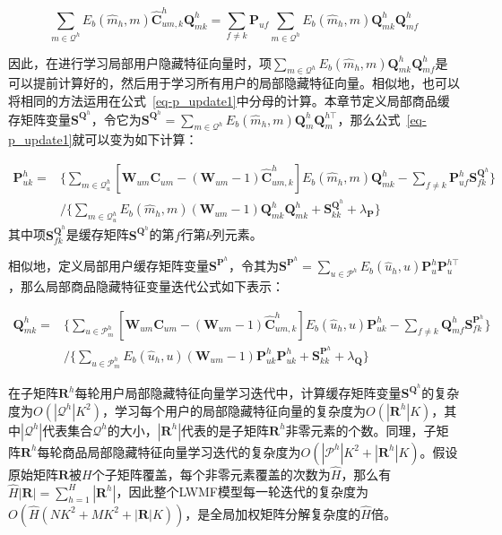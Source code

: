 \begin{equation}
\sum_{m\in \mathcal{Q}^h}\mathit{E_{b}}(\hat{m}_h, m)\mathbf{\hat{C}}_{um,k}^h\mathbf{Q}_{mk}^h 
= \sum_{f\neq k}\mathbf{P}_{uf}\sum_{m\in \mathcal{Q}^h}\mathit{E_{b}}(\hat{m}_h, m)\mathbf{Q}_{mk}^h\mathbf{Q}_{mf}^h
\end{equation}

因此，在进行学习局部用户隐藏特征向量时，项$\sum_{m\in \mathcal{Q}^h}\mathit{E_{b}}(\hat{m}_h, m)\mathbf{Q}_{mk}^h\mathbf{Q}_{mf}^h$是可以提前计算好的，然后用于学习所有用户的局部隐藏特征向量。相似地，也可以将相同的方法运用在公式~\ref{eq-p_update1}中分母的计算。本章节定义局部商品缓存矩阵变量$\mathbf{S}^{\mathbf{Q}^h}$，令它为$\mathbf{S}^{\mathbf{Q}^h}=\sum_{m\in \mathcal{Q}^h}\mathit{E_{b}}(\hat{m}_h, m)\mathbf{Q}_m^h\mathbf{Q}_m^{h\top}$，那么公式~\ref{eq-p_update1}就可以变为如下计算：

\begin{align}
\label{eq-p_update2}
\mathbf{P}_{uk}^h =& \{\sum_{m\in \mathcal{Q}_u^h}[\mathbf{W}_{um}\mathbf{C}_{um}-(\mathbf{W}_{um}-1)\mathbf{\hat{C}}_{um,k}^h]\mathit{E_{b}}(\hat{m}_h, m)\mathbf{Q}_{mk}^h
-\sum_{f\neq k}\mathbf{P}_{uf}^h\mathbf{S}^{\mathbf{Q}^h}_{fk}\}\nonumber\\&/\{\sum_{m\in \mathcal{Q}^h_u}\mathit{E_{b}}(\hat{m}_h, m)(\mathbf{W}_{um}-1)\mathbf{Q}_{mk}^h\mathbf{Q}_{mk}^h+\mathbf{S}^{\mathbf{Q}^h}_{kk}+\lambda_\mathbf{P}\}
\end{align}
其中项$\mathbf{S}^{\mathbf{Q}^h}_{fk}$是缓存矩阵$\mathbf{S}^{\mathbf{Q}^h}$的第$f$行第$k$列元素。

相似地，定义局部用户缓存矩阵变量$\mathbf{S}^{\mathbf{P}^h}$，令其为$\mathbf{S}^{\mathbf{P}^h}=\sum_{u\in \mathcal{P}^h}\mathit{E_{b}}(\hat{u}_h, u)\mathbf{P}_u^h\mathbf{P}_u^{h\top}$，那么局部商品隐藏特征变量迭代公式如下表示：

\begin{align}
\label{eq-q_update2}
\mathbf{Q}_{mk}^h = &\{\sum_{u\in \mathcal{P}_m^h}[\mathbf{W}_{um}\mathbf{C}_{um}-(\mathbf{W}_{um}-1)\mathbf{\hat{C}}_{um,k}^h]\mathit{E_{b}}(\hat{u}_h, u)\mathbf{P}_{uk}^h
-\sum_{f\neq k}\mathbf{Q}_{mf}^h\mathbf{S}^{\mathbf{P}^h}_{fk}\}\nonumber\\&/\{\sum_{u\in \mathcal{P}^h_m}\mathit{E_{b}}(\hat{u}_h, u)(\mathbf{W}_{um}-1)\mathbf{P}_{uk}^h\mathbf{P}_{uk}^h+\mathbf{S}^{\mathbf{P}^h}_{kk}+\lambda_\mathbf{Q}\}
\end{align}

在子矩阵$\mathbf{R}^h$每轮用户局部隐藏特征向量学习迭代中，计算缓存矩阵变量$\mathbf{S}^{\mathbf{Q}^h}$的复杂度为$O(|\mathcal{Q}^h|K^2)$，学习每个用户的局部隐藏特征向量的复杂度为$O(|\mathbf{R}^h|K)$，其中$|\mathcal{Q}^h|$代表集合$\mathcal{Q}^h$的大小，$|\mathbf{R}^h|$代表的是子矩阵$\mathbf{R}^h$非零元素的个数。同理，子矩阵$\mathbf{R}^h$每轮商品局部隐藏特征向量学习迭代的复杂度为$O(|\mathcal{P}^h|K^2+|\mathbf{R}^h|K)$。假设原始矩阵$\mathbf{R}$被$H$个子矩阵覆盖，每个非零元素覆盖的次数为$\hat{H}$，那么有$\hat{H}|\mathbf{R}|=\sum_{h=1}^{H}|\mathbf{R}^h|$，因此整个LWMF模型每一轮迭代的复杂度为$O(\hat{H}(NK^2+MK^2+|\mathbf{R}|K))$，是全局加权矩阵分解复杂度的$\hat{H}$倍。

